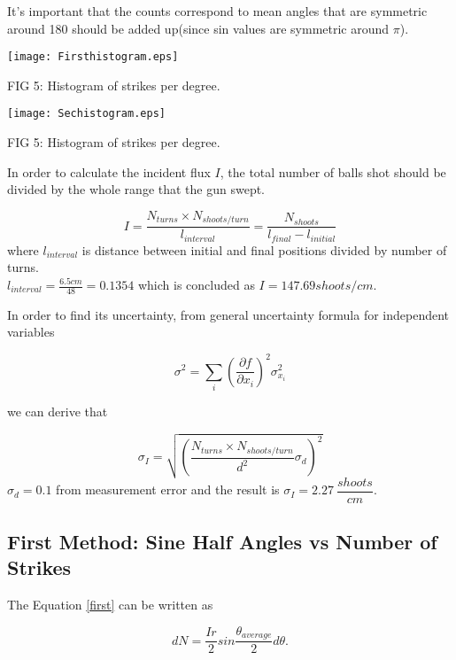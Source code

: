 \documentclass[a4paper]{article}
\begin{document}
\begin{multicols}{2}
\begin{center}
\end{center}

It's important that the counts correspond to mean angles that are symmetric around 180 \textdegree should be added up(since sin values are symmetric around $\pi$).
\begin{center}

\texttt{[image: Firsthistogram.eps]} 

FIG 5: Histogram of strikes per degree.

\texttt{[image: Sechistogram.eps]} 

FIG 5: Histogram of strikes per degree.
\end{center}

In order to calculate the incident flux $I$, the total number of balls shot should be divided by the whole range that the gun swept.

\begin{equation}
I = \dfrac{N_{turns}\times N_{shoots/turn}}{l_{interval}} = \dfrac{N_{shoots}}{l_{final} - l_{initial}}
\end{equation}
where $l_{interval}$ is distance between initial and final positions divided by number of turns.\\
$l_{interval}=\frac{6.5 cm}{48}=0.1354$ which is concluded as $I = 147.69 {shoots}/{cm}$.

In order to find its uncertainty, from general uncertainty formula for independent variables

\begin{equation} \label{uncer}
\sigma^2 = \sum_i (\frac{\partial f}{\partial x_i})^2 \sigma_ {x_i}^2
\end{equation}

we can derive that

\begin{equation}
\sigma_{I} = \sqrt{(\dfrac{N_{turns}\times N_{shoots/turn}}{d^2}\sigma_{d})^2}
\end{equation}
$\sigma_{d}=0.1$ from measurement error and the result is $\sigma_I = 2.27 \ \dfrac{shoots}{cm}$.

\subsection{First Method: Sine Half Angles vs Number of Strikes}

The Equation \ref{first} can be written as 

\begin{equation}
dN = \dfrac{Ir}{2}sin\dfrac{\theta_{average}}{2}d\theta.
\end{equation}


\end{multicols}
\end{document}
